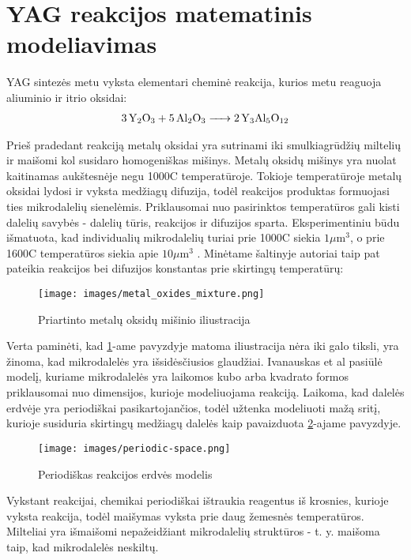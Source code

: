 \section{YAG reakcijos matematinis modeliavimas}


YAG sintezės metu vyksta elementari cheminė reakcija, kurios metu reaguoja aliuminio ir itrio oksidai:
\begin{align*}
  \ce{3Y_2O_3 + 5Al_2O_3 -> 2Y_3Al_5O_12}
\end{align*}

Prieš pradedant reakciją metalų oksidai yra sutrinami iki smulkiagrūdžių miltelių ir maišomi kol susidaro homogeniškas mišinys. Metalų oksidų mišinys yra nuolat kaitinamas aukštesnėje negu 1000\degree C temperatūroje. Tokioje temperatūroje metalų oksidai lydosi ir vyksta medžiagų difuzija, todėl reakcijos produktas formuojasi ties mikrodalelių sienelėmis. Priklausomai nuo pasirinktos temperatūros gali kisti dalelių savybės - dalelių tūris, reakcijos ir difuzijos sparta. Eksperimentiniu būdu išmatuota, kad individualių mikrodalelių turiai prie 1000\degree C siekia $1\mu \text{m}^3$, o prie 1600\degree C temperatūros siekia apie $10\mu\text{m}^3$ \cite{ivanauskasComputationalModellingYAG2009}. Minėtame šaltinyje autoriai taip pat pateikia reakcijos bei difuzijos konstantas prie skirtingų temperatūrų:

\begin{figure}[h]
  \centering
  \texttt{[image: images/metal\_oxides\_mixture.png]}
  \caption{Priartinto metalų oksidų mišinio iliustracija \cite{ivanauskasComputationalModellingYAG2009}}
  \label{fig:metal-oxides-mixuter}
\end{figure}

Verta paminėti, kad \ref{fig:metal-oxides-mixuter}-ame pavyzdyje matoma iliustracija nėra iki galo tiksli, yra žinoma, kad mikrodalelės yra išsidėsčiusios glaudžiai.
\cite{ivanauskasModellingSolidState2005} Ivanauskas et al pasiūlė modelį, kuriame mikrodalelės yra laikomos kubo arba kvadrato formos priklausomai nuo dimensijos, kurioje modeliuojama reakciją. Laikoma, kad dalelės erdvėje yra periodiškai pasikartojančios, todėl užtenka modeliuoti mažą sritį, kurioje susiduria skirtingų medžiagų dalelės kaip pavaizduota \ref{fig:periodic-space}-ajame pavyzdyje. 

\begin{figure}[h]
  \centering
  \texttt{[image: images/periodic-space.png]}
  \caption{Periodiškas reakcijos erdvės modelis}
  \label{fig:periodic-space}
\end{figure}

Vykstant reakcijai, chemikai periodiškai ištraukia reagentus iš krosnies, kurioje vyksta reakcija, todėl maišymas vyksta prie daug žemesnės temperatūros. Milteliai yra išmaišomi nepažeidžiant mikrodalelių struktūros - t. y. maišoma taip, kad mikrodalelės neskiltų.